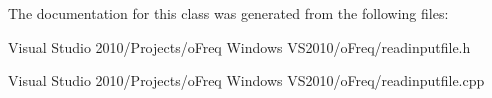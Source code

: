 The documentation for this class was generated from the following files\-:\begin{DoxyCompactItemize}
\item 
Visual Studio 2010/\-Projects/o\-Freq Windows V\-S2010/o\-Freq/readinputfile.\-h\item 
Visual Studio 2010/\-Projects/o\-Freq Windows V\-S2010/o\-Freq/readinputfile.\-cpp\end{DoxyCompactItemize}
